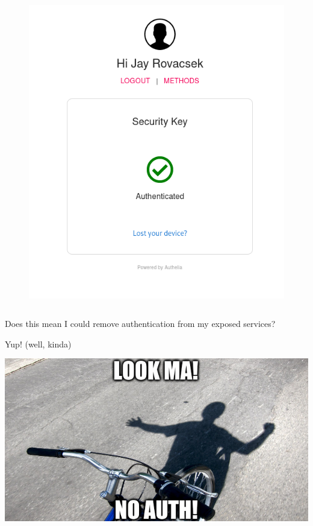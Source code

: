 \documentclass{beamer}
\begin{document}
\begin{frame}
\begin{columns}
\begin{column}{0.5\textwidth}
\begin{figure}
                \includegraphics[width=\textwidth,keepaspectratio]{../resources/2fa_options_alt.png}
            \end{figure}
        \end{column}
    \end{columns}
\end{frame}

\begin{frame}
    \begin{center}
        Does this mean I could remove authentication from my exposed services?
        \vspace{5mm}\par\noindent
        Yup! (well, kinda)
        \vspace{5mm}\par\noindent
        \includegraphics[height=0.5\textheight,keepaspectratio]{../resources/look_ma_no_auth.png}
    \end{center}
\end{frame}
\end{document}

